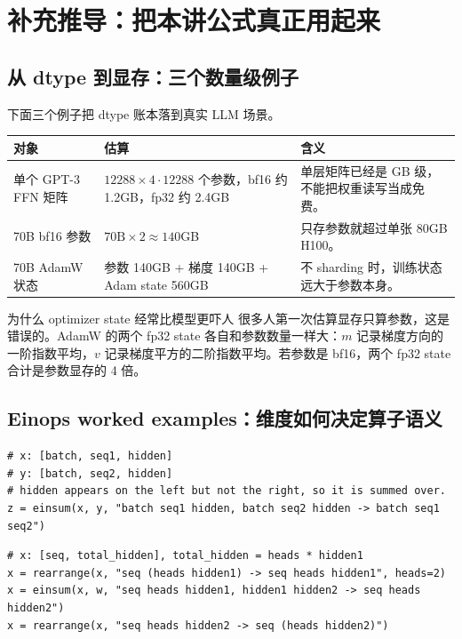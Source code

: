 \section{补充推导：把本讲公式真正用起来}

\subsection{从 dtype 到显存：三个数量级例子}

下面三个例子把 dtype 账本落到真实 LLM 场景。

\begin{longtable}{p{}p{}p{}}
\toprule
\textbf{对象} & \textbf{估算} & \textbf{含义} \\
\midrule
单个 GPT-3 FFN 矩阵 & \(12288\times 4\cdot 12288\) 个参数，bf16 约 1.2GB，fp32 约 2.4GB & 单层矩阵已经是 GB 级，不能把权重读写当成免费。 \\
70B bf16 参数 & \(70\text{B}\times 2\approx 140\)GB & 只存参数就超过单张 80GB H100。 \\
70B AdamW 状态 & 参数 140GB + 梯度 140GB + Adam state 560GB & 不 sharding 时，训练状态远大于参数本身。 \\
\bottomrule
\end{longtable}

\begin{knowledgebox}{为什么 optimizer state 经常比模型更吓人}
很多人第一次估算显存只算参数，这是错误的。AdamW 的两个 fp32 state 各自和参数数量一样大：\(m\) 记录梯度方向的一阶指数平均，\(v\) 记录梯度平方的二阶指数平均。若参数是 bf16，两个 fp32 state 合计是参数显存的 4 倍。
\end{knowledgebox}

\subsection{Einops worked examples：维度如何决定算子语义}

\begin{lstlisting}[caption={einsum 明确说明 contracting dimension}]
# x: [batch, seq1, hidden]
# y: [batch, seq2, hidden]
# hidden appears on the left but not the right, so it is summed over.
z = einsum(x, y, "batch seq1 hidden, batch seq2 hidden -> batch seq1 seq2")
\end{lstlisting}

\begin{lstlisting}[caption={rearrange 把一个维度拆成 heads 和 hidden}]
# x: [seq, total_hidden], total_hidden = heads * hidden1
x = rearrange(x, "seq (heads hidden1) -> seq heads hidden1", heads=2)
x = einsum(x, w, "seq heads hidden1, hidden1 hidden2 -> seq heads hidden2")
x = rearrange(x, "seq heads hidden2 -> seq (heads hidden2)")
\end{lstlisting}

